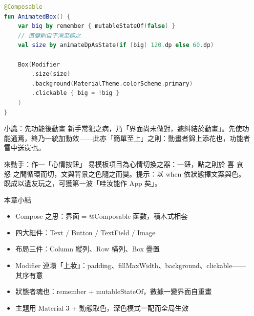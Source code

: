 \begin{lstlisting}[language=Kotlin]
@Composable
fun AnimatedBox() {
    var big by remember { mutableStateOf(false) }
    // 值變則自平滑至標之
    val size by animateDpAsState(if (big) 120.dp else 60.dp)

    Box(Modifier
        .size(size)
        .background(MaterialTheme.colorScheme.primary)
        .clickable { big = !big }
    )
}
\end{lstlisting}

\begin{tcbinfo}{小識：先功能後動畫}
新手常犯之病，乃「界面尚未做對，遽糾結於動畫」。先使功能通焉，終乃一統加動效——此亦「簡單至上」之則：動畫者錦上添花也，功能者雪中送炭也。

\end{tcbinfo}

\begin{tcbpractice}{來動手：作一「心情按鈕」}
易模板項目為心情切換之器：一鈕，點之則於 喜 哀 怒 之間循環而切，文與背景之色隨之而變。提示：以 when 依狀態擇文案與色。既成以遺友玩之，可獲第一波「哇汝能作 App 矣」。

\end{tcbpractice}

\begin{tcbsummary}{本章小結}
\begin{itemize}
  \item Compose 之思：界面 = @Composable 函數，積木式相套
  \item 四大組件：Text / Button / TextField / Image
  \item 布局三件：Column 縱列、Row 橫列、Box 疊置
  \item Modifier 連環「上妝」：padding、fillMaxWidth、background、clickable——其序有意
  \item 狀態者魂也：remember + mutableStateOf，數據一變界面自重畫
  \item 主題用 Material 3 + 動態取色，深色模式一配而全局生效
\end{itemize}

\end{tcbsummary}
